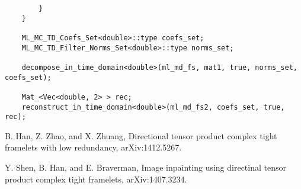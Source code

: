 \documentclass[a4paper,5pt]{article}
\begin{document}
\begin{lstlisting}
		}
	}

	ML_MC_TD_Coefs_Set<double>::type coefs_set;
	ML_MC_TD_Filter_Norms_Set<double>::type norms_set;

	decompose_in_time_domain<double>(ml_md_fs, mat1, true, norms_set, coefs_set);

	Mat_<Vec<double, 2> > rec;
	reconstruct_in_time_domain<double>(ml_md_fs2, coefs_set, true, rec);
\end{lstlisting}

\begin{thebibliography}{99}
B. Han, Z. Zhao, and X. Zhuang, Directional tensor product complex tight framelets with low redundancy, arXiv:1412.5267.

Y. Shen, B. Han, and E. Braverman, Image inpainting using directinal tensor product complex tight framelets, arXiv:1407.3234.

\end{thebibliography}
\end{document}
